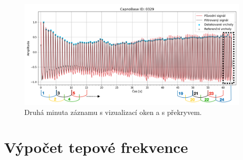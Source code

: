 \begin{figure} [h]
	\label{fig:my-detection}
	\centering
	\includegraphics[width=1\textwidth]{./obrazky/My_peaks.png}
	\caption[Vlastní detekce vrcholů]{Druhá minuta záznamu s vizualizací oken a s překryvem.}
\end{figure}

\section{Výpočet tepové frekvence}
\label{sec:alg_hr}



